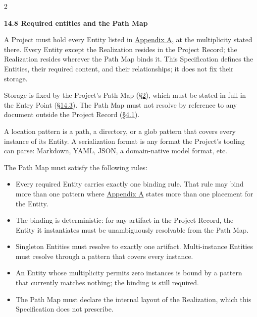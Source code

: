 \begin{multicols}{2}
\hypertarget{nss-14.8}{}

\par\smallskip\noindent\textbf{14.8 Required entities and the Path Map}\par\nopagebreak

A Project must hold every Entity listed in \hyperlink{nss-appA}{Appendix A}, at the multiplicity stated there. Every Entity except the Realization resides in the Project Record; the Realization resides wherever the Path Map binds it. This Specification defines the Entities, their required content, and their relationships; it does not fix their storage.

Storage is fixed by the Project's Path Map (\hyperlink{nss-2}{\S2}), which must be stated in full in the Entry Point (\hyperlink{nss-14.3}{\S14.3}). The Path Map must not resolve by reference to any document outside the Project Record (\hyperlink{nss-4.1}{\S4.1}).

A location pattern is a path, a directory, or a glob pattern that covers every instance of its Entity. A serialization format is any format the Project's tooling can parse: Markdown, YAML, JSON, a domain-native model format, etc.

The Path Map must satisfy the following rules:

\begin{itemize}\setlength{\itemsep}{0pt}\setlength{\parskip}{0pt}

\item Every required Entity carries exactly one binding rule. That rule may bind more than one pattern where \hyperlink{nss-appA}{Appendix A} states more than one placement for the Entity.

\item The binding is deterministic: for any artifact in the Project Record, the Entity it instantiates must be unambiguously resolvable from the Path Map.

\item Singleton Entities must resolve to exactly one artifact. Multi-instance Entities must resolve through a pattern that covers every instance.

\item An Entity whose multiplicity permits zero instances is bound by a pattern that currently matches nothing; the binding is still required.

\item The Path Map must declare the internal layout of the Realization, which this Specification does not prescribe.


\end{itemize}
\end{multicols}
